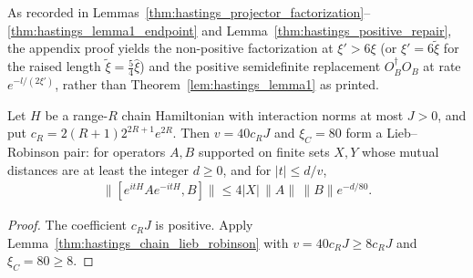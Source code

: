 As recorded in Lemmas~\ref{thm:hastings_projector_factorization}--\ref{thm:hastings_lemma1_endpoint}
and Lemma~\ref{thm:hastings_positive_repair}, the appendix proof yields the
non-positive factorization at $\xi'>6\xi$ (or $\xi'=6\tilde\xi$ for the raised
length $\tilde\xi=\tfrac54\hat\xi$) and the positive semidefinite
replacement $O_B^\dagger O_B$ at rate $e^{-l/(2\xi')}$, rather than
Theorem~\ref{lem:hastings_lemma1} as printed.

\begin{lemma}
    \label{thm:hastings_source_pair}
    \leanok
    Let $H$ be a range-$R$ chain Hamiltonian with interaction norms at most
    $J>0$, and put $c_R=2(R+1)2^{2R+1}e^{2R}$. Then $v=40c_RJ$ and
    $\xi_C=80$ form a Lieb--Robinson pair: for operators $A,B$ supported on
    finite sets $X,Y$ whose mutual distances are at least the integer
    $d\ge0$, and for $|t|\le d/v$,
    \begin{align}
        \|[e^{itH}Ae^{-itH},B]\|
        \le4|X|\,\|A\|\,\|B\|e^{-d/80}.
        \label{eq:hastings_interaction_proportional_pair}
    \end{align}
\end{lemma}
\begin{proof}\leanok
    The coefficient $c_RJ$ is positive. Apply
    Lemma~\ref{thm:hastings_chain_lieb_robinson} with $v=40c_RJ\ge8c_RJ$
    and $\xi_C=80\ge8$.
\end{proof}

